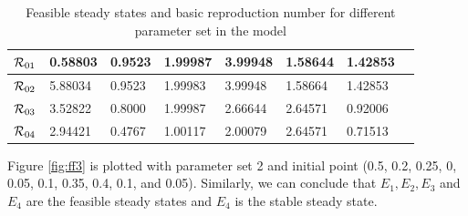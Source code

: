 \begin{table}
\begin{tabular}{|p{1.9cm}|p{1.8cm}|p{1.8cm}|p{1.8cm}|p{1.8cm}|p{1.8cm}|p{1.8cm}|p{1.8cm}|}
  \hline
  ${{\cal R}}_{01}$ & 0.58803   & 0.9523    & 1.99987  & 3.99948  & 1.58644  & 1.42853 \\
  \hline
  ${{\cal R}}_{02}$ & 5.88034   & 0.9523 & 1.99983 & 3.99948 & 1.58664    & 1.42853 \\
  \hline
  ${{\cal R}}_{03}$ & 3.52822   & 0.8000   & 1.99987 & 2.66644  & 2.64571 & 0.92006  \\
  \hline
  ${{\cal R}}_{04}$ & 2.94421   & 0.4767  & 1.00117   & 2.00079 & 2.64571     & 0.71513\\
  \hline
    \end{tabular}
\caption{Feasible steady states and basic reproduction number for different parameter set in the model}\label{T1}
\end{table}

%

\noindent Figure \ref{fig:ff3} is plotted with parameter set 2 and initial point (0.5, 0.2, 0.25, 0, 0.05, 0.1, 0.35, 0.4, 0.1, and 0.05).
Similarly, we can conclude that $ E_{1}, E_{2}, E_{3}$ and $E_{4}$ are the feasible steady states and $E_{4}$ is the stable steady state.

%
%


